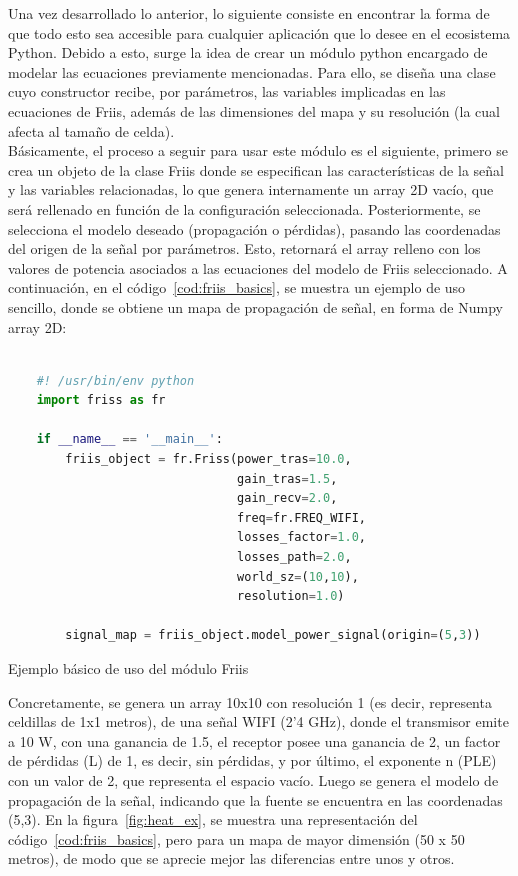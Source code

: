 Una vez desarrollado lo anterior, lo siguiente consiste en encontrar la forma de que todo esto sea accesible para cualquier aplicación que lo desee en el ecosistema Python. Debido a esto, surge la idea de crear un módulo python encargado de modelar las ecuaciones previamente mencionadas. Para ello, se diseña una clase cuyo constructor recibe, por parámetros, las variables implicadas en las ecuaciones de Friis, además de las dimensiones del mapa y su resolución (la cual afecta al tamaño de celda).\\

Básicamente, el proceso a seguir para usar este módulo es el siguiente, primero se crea un objeto de la clase Friis donde se especifican las características de la señal y las variables relacionadas, lo que genera internamente un array 2D vacío, que será rellenado en función de la configuración seleccionada. Posteriormente, se selecciona el modelo deseado (propagación o pérdidas), pasando las coordenadas del origen de la señal por parámetros. Esto, retornará el array relleno con los valores de potencia asociados a las ecuaciones del modelo de Friis seleccionado. A continuación, en el código~\ref{cod:friis_basics}, se muestra un ejemplo de uso sencillo, donde se obtiene un mapa de propagación de señal, en forma de Numpy array 2D:

\begin{code}[H]
    \begin{lstlisting}[language=Python]

    #! /usr/bin/env python
    import friss as fr

    if __name__ == '__main__':
        friis_object = fr.Friss(power_tras=10.0,
                                gain_tras=1.5,
                                gain_recv=2.0,
                                freq=fr.FREQ_WIFI,
                                losses_factor=1.0,
                                losses_path=2.0,
                                world_sz=(10,10),
                                resolution=1.0)

        signal_map = friis_object.model_power_signal(origin=(5,3))

\end{lstlisting}
\caption[Ejemplo básico de uso del módulo Friis]{Ejemplo básico de uso del módulo Friis}
\label{cod:friis_basics}
\end{code}

Concretamente, se genera un array 10x10 con resolución 1 (es decir, representa celdillas de 1x1 metros), de una señal WIFI (2'4 GHz), donde el transmisor emite a 10 W, con una ganancia de 1.5, el receptor posee una ganancia de 2, un factor de pérdidas (L) de 1, es decir, sin pérdidas, y por último, el exponente n (\ac{PLE}) con un valor de 2, que representa el espacio vacío. Luego se genera el modelo de propagación de la señal, indicando que la fuente se encuentra en las coordenadas (5,3). En la figura~\ref{fig:heat_ex}, se muestra una representación del código~\ref{cod:friis_basics}, pero para un mapa de mayor dimensión (50 x 50 metros), de modo que se aprecie mejor las diferencias entre unos y otros.\\


